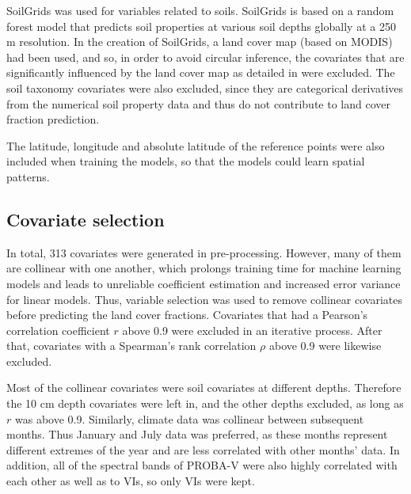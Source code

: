 \documentclass[review,authoryear,3p]{elsarticle}
\begin{document}
SoilGrids \citep{hengl_soilgrids250m_2017} was used for variables related to soils.
SoilGrids is based on a random forest model that predicts soil properties at various soil depths globally at a 250 m resolution.
In the creation of SoilGrids, a land cover map (based on MODIS) had been used, and so, in order to avoid circular inference, the covariates that are significantly influenced by the land cover map as detailed in \citet{hengl_soilgrids250m_2017} were excluded.
The soil taxonomy covariates were also excluded, since they are categorical derivatives from the numerical soil property data and thus do not contribute to land cover fraction prediction.


The latitude, longitude and absolute latitude of the reference points were also included when training the models, so that the models could learn spatial patterns.

\subsection{Covariate selection}
\label{sec-covariate-selection}

In total, 313 covariates were generated in pre-processing.
However, many of them are collinear with one another, which prolongs training time for machine learning models and leads to unreliable coefficient estimation and increased error variance for linear models.
Thus, variable selection was used to remove collinear covariates before predicting the land cover fractions.
Covariates that had a Pearson's correlation coefficient $r$ \citep{pearson_notes_1895} above 0.9 were excluded in an iterative process.
After that, covariates with a Spearman's rank correlation $\rho$ \citep{spearman1904rank} above 0.9 were likewise excluded.

Most of the collinear covariates were soil covariates at different depths.
Therefore the 10 cm depth covariates were left in, and the other depths excluded, as long as $r$ was above 0.9.
Similarly, climate data was collinear between subsequent months. Thus January and July data was preferred, as these months represent different extremes of the year and are less correlated with other months' data.
In addition, all of the spectral bands of PROBA-V were also highly correlated with each other as well as to \glspl{VI}, so only \glspl{VI} were kept.
\end{document}
